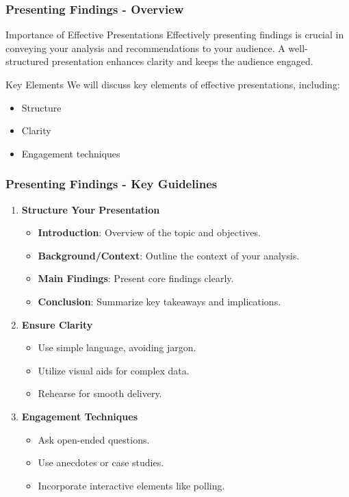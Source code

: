 \documentclass[aspectratio=169]{beamer}
\begin{document}
\begin{frame}[fragile]
    \frametitle{Presenting Findings - Overview}
    \begin{block}{Importance of Effective Presentations}
        Effectively presenting findings is crucial in conveying your analysis and recommendations to your audience. 
        A well-structured presentation enhances clarity and keeps the audience engaged.
    \end{block}

    \begin{block}{Key Elements}
        We will discuss key elements of effective presentations, including:
        \begin{itemize}
            \item Structure
            \item Clarity
            \item Engagement techniques
        \end{itemize}
    \end{block}
\end{frame}

\begin{frame}[fragile]
    \frametitle{Presenting Findings - Key Guidelines}
    \begin{enumerate}
        \item \textbf{Structure Your Presentation}
            \begin{itemize}
                \item \textbf{Introduction}: Overview of the topic and objectives.
                \item \textbf{Background/Context}: Outline the context of your analysis.
                \item \textbf{Main Findings}: Present core findings clearly.
                \item \textbf{Conclusion}: Summarize key takeaways and implications.
            \end{itemize}
        
        \item \textbf{Ensure Clarity}
            \begin{itemize}
                \item Use simple language, avoiding jargon.
                \item Utilize visual aids for complex data.
                \item Rehearse for smooth delivery.
            \end{itemize}

        \item \textbf{Engagement Techniques}
            \begin{itemize}
                \item Ask open-ended questions.
                \item Use anecdotes or case studies.
                \item Incorporate interactive elements like polling.
            \end{itemize}
    \end{enumerate}
\end{frame}
\end{document}
